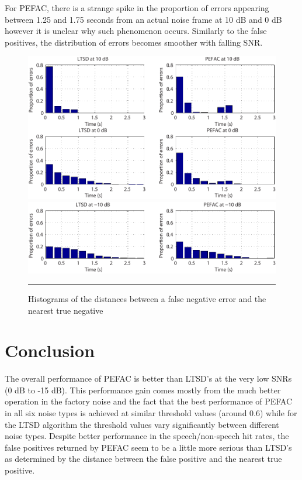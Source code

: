 For PEFAC, there is a strange spike in the proportion of errors appearing between 1.25 and 1.75 seconds from an actual noise frame at 10 dB and 0 dB however it is unclear why such phenomenon occurs. Similarly to the false positives, the distribution of errors becomes smoother with falling SNR.

\begin{figure}[htbp]
	\centering
		\includegraphics[width=1.0\columnwidth]{Figures/Chapter5/histNoi10dB0dB.pdf}
		\includegraphics[width=1.0\columnwidth]{Figures/Chapter5/histNoim10dB.pdf}
		\rule{37em}{0.5pt}
	\caption[Histograms of the distances between a false negative error and the nearest true negative]{Histograms of the distances between a false negative error and the nearest true negative}
	\label{fig:histNoi}
\end{figure}


\section{Conclusion}

The overall performance of PEFAC is better than LTSD's at the very low SNRs (0 dB to -15 dB). This performance gain comes mostly from the much better operation in the factory noise and the fact that the best performance of PEFAC in all six noise types is achieved at similar threshold values (around 0.6) while for the LTSD algorithm the threshold values vary significantly between different noise types. Despite better performance in the speech/non-speech hit rates, the false positives returned by PEFAC seem to be a little more serious than LTSD's as determined by the distance between the false positive and the nearest true positive.

